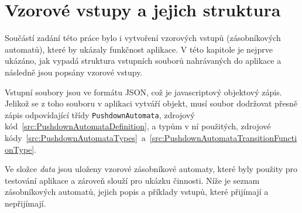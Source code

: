 \chapter{Vzorové vstupy a jejich struktura}\label{chap:Inputs}

Součástí zadání této práce bylo i vytvoření vzorových vstupů (zásobníkových automatů), které by ukázaly funkčnost aplikace. V této kapitole je nejprve ukázáno, jak vypadá struktura vstupních souborů nahrávaných do aplikace a následně jsou popsány vzorové vstupy.

Vstupní soubory jsou ve formátu JSON, což je javascriptový objektový zápis. Jelikož se z toho souboru v aplikaci vytváří objekt, musí soubor dodržovat přesně zápis odpovídající třídy \texttt{PushdownAutomata}, zdrojový kód~\ref{src:PushdownAutomataDefinition}, a typům v ní použitých, zdrojové kódy~\ref{src:PushdownAutomataTypes}~a~\ref{src:PushdownAutomataTransitionFunctionType}.

Ve složce \textit{data} jsou uloženy vzorové zásobníkové automaty, které byly použity pro testování aplikace a zároveň slouží pro ukázku činnosti. Níže je seznam zásobníkových automatů, jejich popis a příklady vstupů, které přijímají a nepřijímají.

